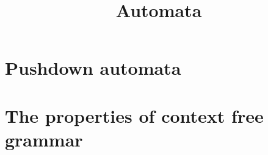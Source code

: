 \documentclass[12pt]{book}
\theoremstyle{definition}
\theoremstyle{remark}
\begin{document}
\title{Automata}
\maketitle
\tableofcontents
\chapter{Pushdown automata}

\chapter{The properties of context free grammar}

\end{document}

